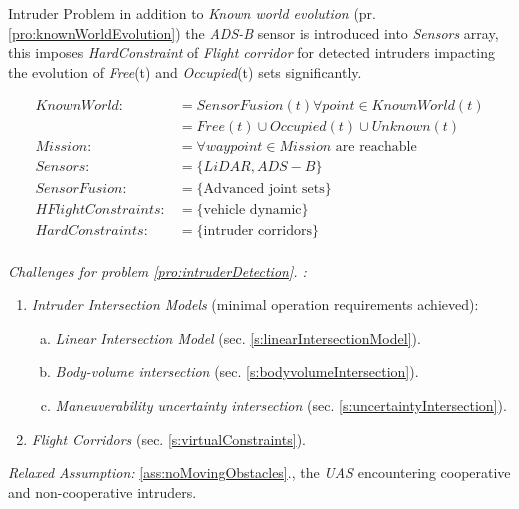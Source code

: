 \begin{problem}{Intruder Problem}\label{pro:intruderDetection}
    in addition to \emph{Known world evolution} (pr.\ref{pro:knownWorldEvolution}) the \emph{ADS-B} sensor is introduced into \emph{Sensors} array, this imposes \emph{HardConstraint} of \emph{Flight corridor} for detected intruders impacting the evolution of \emph{Free}(t) and \emph{Occupied}(t) sets significantly.
    
    \begin{equation}\label{eq:intruderDetectionProblemdefinition}
        \begin{aligned}
            KnownWorld:&= SensorFusion(t)\forall point\in KnownWorld(t)\\
                       &=Free(t) \cup Occupied(t) \cup Unknown(t)\\
            Mission:&= \forall waypoint\in Mission \text{ are reachable}\\
            Sensors:&= \{LiDAR,ADS-B\}\\
            SensorFusion:&= \{\text{Advanced joint sets}\}\\
            HFlightConstraints:&=\{\text{vehicle dynamic}\}\\
            HardConstraints:&=\{\text{intruder corridors}\}\\
        \end{aligned}
    \end{equation}
    

    \noindent \emph{Challenges for problem  \ref{pro:intruderDetection}. :}
    \begin{enumerate}
        \item \emph{Intruder Intersection Models} (minimal operation requirements achieved):
        \begin{enumerate}[a.]
            \item \emph{Linear Intersection Model} (sec. \ref{s:linearIntersectionModel}).
            \item \emph{Body-volume intersection} (sec. \ref{s:bodyvolumeIntersection}).
            \item \emph{Maneuverability uncertainty intersection} (sec. \ref{s:uncertaintyIntersection}).
        \end{enumerate}
        
        \item \emph{Flight Corridors} (sec. \ref{s:virtualConstraints}).
    \end{enumerate}
    
    \noindent \emph{Relaxed Assumption: } \ref{ass:noMovingObstacles}., the \emph{UAS} encountering cooperative and non-cooperative intruders.
\end{problem}




